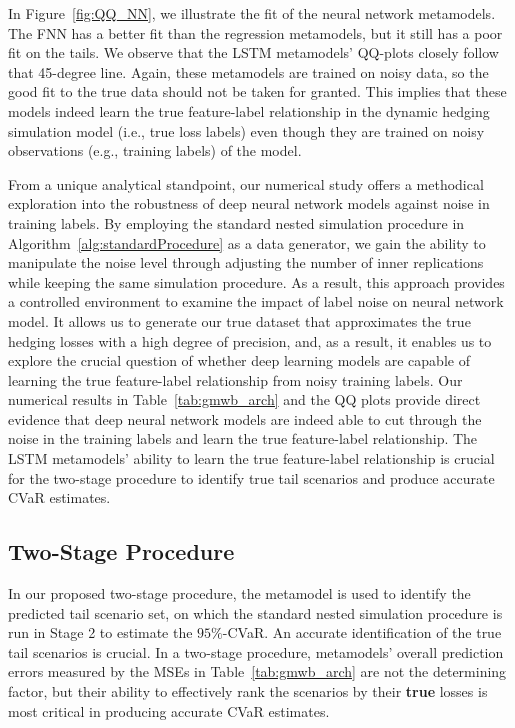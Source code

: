 \documentclass{article}
\begin{document}
In Figure~\ref{fig:QQ_NN}, we illustrate the fit of the neural network metamodels.
The FNN has a better fit than the regression metamodels, but it still has a poor fit on the tails.
We observe that the LSTM metamodels' QQ-plots closely follow that 45-degree line.
Again, these metamodels are trained on noisy data, so the good fit to the true data should not be taken for granted.
This implies that these models indeed learn the true feature-label relationship in the dynamic hedging simulation model (i.e., true loss labels) even though they are trained on noisy observations (e.g., training labels) of the model.

From a unique analytical standpoint, our numerical study offers a methodical exploration into the robustness of deep neural network models against noise in training labels. 
By employing the standard nested simulation procedure in Algorithm~\ref{alg:standardProcedure} as a data generator, we gain the ability to manipulate the noise level through adjusting the number of inner replications while keeping the same simulation procedure.
As a result, this approach provides a controlled environment to examine the impact of label noise on neural network model.
It allows us to generate our true dataset that approximates the true hedging losses with a high degree of precision, and, as a result, it enables us to explore the crucial question of whether deep learning models are capable of learning the true feature-label relationship from noisy training labels.
Our numerical results in Table~\ref{tab:gmwb_arch} and the QQ plots provide direct evidence that deep neural network models are indeed able to cut through the noise in the training labels and learn the true feature-label relationship.
The LSTM metamodels' ability to learn the true feature-label relationship is crucial for the two-stage procedure to identify true tail scenarios and produce accurate CVaR estimates.

\subsection{Two-Stage Procedure} \label{subsec:twoStageProcedure}

In our proposed two-stage procedure, the metamodel is used to identify the predicted tail scenario set, on which the standard nested simulation procedure is run in Stage 2 to estimate the $95\%$-CVaR.
An accurate identification of the true tail scenarios is crucial.
In a two-stage procedure, metamodels' overall prediction errors measured by the MSEs in Table~\ref{tab:gmwb_arch} are not the determining factor, but their ability to effectively rank the scenarios by their \textbf{true} losses is most critical in producing accurate CVaR estimates.
\end{document}
